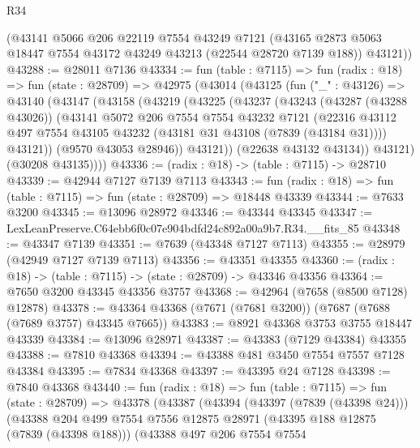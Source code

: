 \begin{lexlean}{R34}
\begin{coremodule}
      (@43141
        @5066
        @206
        @22119
        @7554
        @43249
        @7121
        (@43165 @2873 @5063 @18447 @7554 @43172 @43249 @43213 (@22544 @28720 @7139 @188))
        @43121))
@43288 := @28011 @7136
@43334 := fun (table : @7115) =>
  fun (radix : @18) =>
  fun (state : @28709) =>
  @42975
    (@43014
      (@43125
        (fun ("_" : @43126) =>
        @43140
          (@43147
            (@43158
              (@43219
                (@43225
                  (@43237
                    (@43243
                      (@43287 (@43288 @43026))
                      (@43141
                        @5072
                        @206
                        @7554
                        @7554
                        @43232
                        @7121
                        (@22316
                          @43112
                          @497
                          @7554
                          @43105
                          @43232
                          (@43181 @31 @43108 (@7839 (@43184 @31))))
                        @43121))
                    (@9570 @43053 @28946))
                  @43121))
              (@22638 @43132 @43134))
            @43121)
          (@30208 @43135))))
@43336 := (radix : @18) -> (table : @7115) -> @28710
@43339 := @42944 @7127 @7139 @7113
@43343 := fun (radix : @18) => fun (table : @7115) => fun (state : @28709) => @18448 @43339
@43344 := @7633 @3200
@43345 := @13096 @28972
@43346 := @43344 @43345
@43347 := LexLeanPreserve.C64ebb6f0c07e904bdfd24c892a00a9b7.R34.__fits_85
@43348 := @43347 @7139
@43351 := @7639 (@43348 @7127 @7113)
@43355 := @28979 (@42949 @7127 @7139 @7113)
@43356 := @43351 @43355
@43360 := (radix : @18) -> (table : @7115) -> (state : @28709) -> @43346 @43356
@43364 := @7650 @3200 @43345 @43356 @3757
@43368 := @42964 (@7658 (@8500 @7128) @12878)
@43378 := @43364 @43368 (@7671 (@7681 @3200)) (@7687 (@7688 (@7689 @3757) @43345 @7665))
@43383 := @8921 @43368 @3753 @3755 @18447 @43339
@43384 := @13096 @28971
@43387 := @43383 (@7129 @43384) @43355
@43388 := @7810 @43368
@43394 := @43388 @481 @3450 @7554 @7557 @7128 @43384
@43395 := @7834 @43368
@43397 := @43395 @24 @7128
@43398 := @7840 @43368
@43440 := fun (radix : @18) =>
  fun (table : @7115) =>
  fun (state : @28709) =>
  @43378
    (@43387
      (@43394
        (@43397 (@7839 (@43398 @24)))
        (@43388
          @204
          @499
          @7554
          @7556
          @12875
          @28971
          (@43395 @188 @12875 (@7839 (@43398 @188)))
          (@43388
            @497
            @206
            @7554
            @7554

\end{coremodule}
\end{lexlean}
